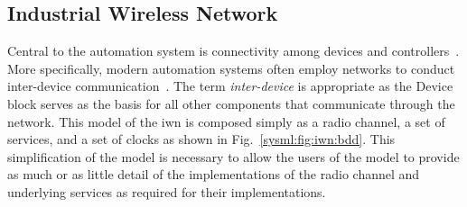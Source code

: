 \subsection{Industrial Wireless Network}

Central to the automation system is connectivity among devices and controllers~\cite{controlWSAN2010}.  More specifically, modern automation systems often employ networks to conduct inter-device communication~\cite{wirelessAutomation2017}.  The term \textit{inter-device} is appropriate as the Device block serves as the basis for all other components that communicate through the network.  This model of the \gls{iwn} is composed simply as a radio channel, a set of services, and a set of clocks as shown in Fig.~\ref{sysml:fig:iwn:bdd}.  This simplification of the model is necessary to allow the users of the model to provide as much or as little detail of the implementations of the radio channel and underlying services as required for their implementations.


